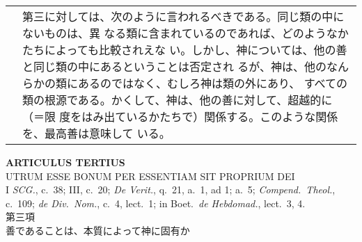 \documentclass[10pt]{jsarticle} %
\begin{document}
\begin{longtable}{p{21em}p{21em}}
&

第三に対しては、次のように言われるべきである。同じ類の中にないものは、異
 なる類に含まれているのであれば、どのようなかたちによっても比較されえな
 い。しかし、神については、他の善と同じ類の中にあるということは否定され
 るが、神は、他のなんらかの類にあるのではなく、むしろ神は類の外にあり、
 すべての類の根源である。かくして、神は、他の善に対して、超越的に（＝限
 度をはみ出ているかたちで）関係する。このような関係を、最高善は意味して
 いる。

 
\end{longtable}
\newpage
{}

\begin{center}
 {\Large {\bf ARTICULUS TERTIUS}}\\
 {\large UTRUM ESSE BONUM PER ESSENTIAM SIT PROPRIUM DEI}\\
 {\footnotesize I {\itshape SCG.}, c.~38; III, c.~20; {\itshape De
 Verit.}, q.~21, a.~1, ad 1; a.~5; {\itshape Compend.~Theol.}, c.~109;
 {\itshape de Div.~Nom.}, c.~4, lect.~1; in Boet.~{\itshape de
 Hebdomad.}, lect.~3, 4.}\\
 {\Large 第三項\\善であることは、本質によって神に固有か }
\end{center}
\end{document}

